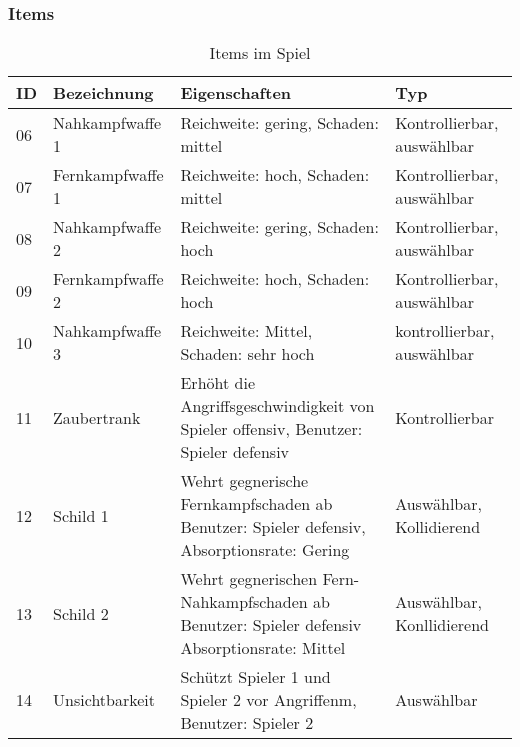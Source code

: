 \documentclass[11pt]{article}
\begin{document}
\begin{table}[htbp]
\subsubsection*{Items}
\centering
\begin{tabular}{|p{}|p{}|p{}|p{}|}
\hline
\textbf{ID} & \textbf{Bezeichnung} & \textbf{Eigenschaften} & \textbf{Typ} \\
\hline
06 & Nahkampfwaffe 1 & Reichweite: gering, Schaden: mittel & Kontrollierbar, auswählbar \\
\hline
07 & Fernkampfwaffe 1 & Reichweite: hoch, Schaden: mittel & Kontrollierbar, auswählbar \\
\hline
08 & Nahkampfwaffe 2 & Reichweite: gering, Schaden: hoch & Kontrollierbar, auswählbar\\
\hline
09 & Fernkampfwaffe 2 & Reichweite: hoch, Schaden: hoch & Kontrollierbar, auswählbar\\
\hline
10 & Nahkampfwaffe 3 & Reichweite: Mittel, Schaden: sehr hoch & kontrollierbar, auswählbar\\
\hline
11 & Zaubertrank & Erhöht die Angriffsgeschwindigkeit von Spieler offensiv, Benutzer: Spieler defensiv
 & Kontrollierbar \\
\hline
12 & Schild 1 & Wehrt gegnerische Fernkampfschaden ab
Benutzer: Spieler defensiv, Absorptionsrate: Gering
 & Auswählbar, Kollidierend \\
\hline
13 & Schild 2 & Wehrt gegnerischen Fern- Nahkampfschaden ab
Benutzer: Spieler defensiv
Absorptionsrate: Mittel
 & Auswählbar, Konllidierend \\
\hline
14 & Unsichtbarkeit & Schützt Spieler 1 und Spieler 2 vor Angriffenm, Benutzer: Spieler 2
 & Auswählbar \\
\hline
\end{tabular}
\caption{Items im Spiel}
\end{table}
\end{document}
